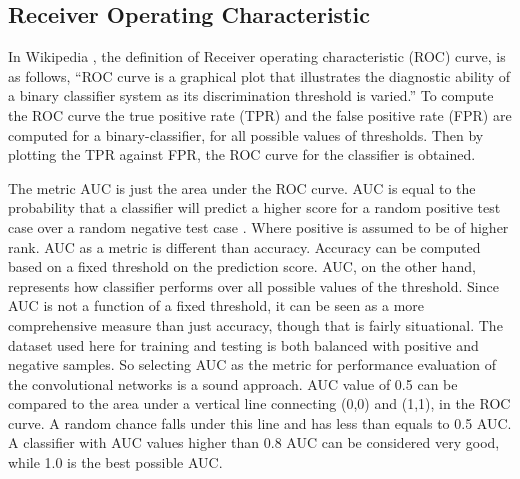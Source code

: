 \subsection{Receiver Operating Characteristic}
In Wikipedia \cite{wikiroc}, the definition of Receiver operating characteristic (ROC) curve, is as follows, ``ROC curve is a graphical plot that illustrates the diagnostic ability of a binary classifier system as its discrimination threshold is varied.'' 
To compute the ROC curve the true positive rate (TPR) and the false positive rate (FPR) are computed for a binary-classifier, for all possible values of thresholds. Then by plotting the TPR against FPR, the ROC curve for the classifier is obtained.

The metric AUC is just the area under the ROC curve. AUC is equal to the probability that a classifier will predict a higher score for a random positive test case over a random negative test case \cite{wikiroc}. Where positive is assumed to be of higher rank.
AUC as a metric is different than accuracy. Accuracy can be computed based on a fixed threshold on the prediction score. AUC, on the other hand, represents how classifier performs over all possible values of the threshold. Since AUC is not a function 
of a fixed threshold, it can be seen as a more comprehensive measure than just accuracy, though that is fairly situational.
The dataset used here for training and testing is both balanced with positive and negative samples. So selecting AUC as the metric for performance evaluation of the convolutional networks is a sound approach. 
AUC value of 0.5 can be compared to the area under a vertical line connecting (0,0) and (1,1), in the ROC curve. A random chance falls under this line and has less than equals to 0.5 AUC. A classifier with AUC values higher than 0.8 AUC can be considered very good, while 1.0 is the best possible AUC.

